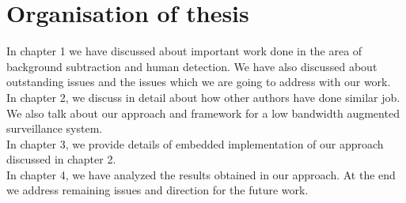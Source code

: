 \section{Organisation of thesis}
\indent In chapter 1 we have discussed about important work done in the
area of background subtraction and human detection. We have also
discussed about outstanding issues and the issues which we are going to
address with our work.\\
\indent In chapter 2, we discuss in detail about how other authors
have done similar job. We also talk about our approach and
framework for a low bandwidth augmented surveillance system.\\
\indent In chapter 3, we provide details of embedded implementation of
our approach discussed in chapter 2.\\
\indent In chapter 4, we have analyzed the results obtained in our
approach. At the end we address remaining issues and direction for the
future work.
